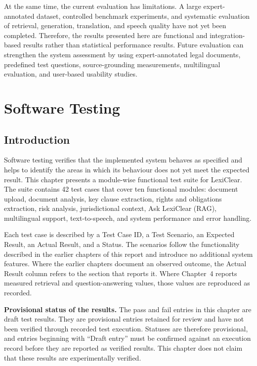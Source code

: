 \documentclass[12pt,a4paper,oneside]{report}
\begin{document}
At the same time, the current evaluation has limitations. A large expert-annotated dataset, controlled benchmark experiments, and systematic evaluation of retrieval, generation, translation, and speech quality have not yet been completed. Therefore, the results presented here are functional and integration-based results rather than statistical performance results. Future evaluation can strengthen the system assessment by using expert-annotated legal documents, predefined test questions, source-grounding measurements, multilingual evaluation, and user-based usability studies.

\chapter{Software Testing}

\section{Introduction}
Software testing verifies that the implemented system behaves as specified and helps to identify the areas in which its behaviour does not yet meet the expected result. This chapter presents a module-wise functional test suite for LexiClear. The suite contains 42 test cases that cover ten functional modules: document upload, document analysis, key clause extraction, rights and obligations extraction, risk analysis, jurisdictional context, Ask LexiClear (RAG), multilingual support, text-to-speech, and system performance and error handling.

Each test case is described by a Test Case ID, a Test Scenario, an Expected Result, an Actual Result, and a Status. The scenarios follow the functionality described in the earlier chapters of this report and introduce no additional system features. Where the earlier chapters document an observed outcome, the Actual Result column refers to the section that reports it. Where Chapter~4 reports measured retrieval and question-answering values, those values are reproduced as recorded.

\textbf{Provisional status of the results.} The pass and fail entries in this chapter are draft test results. They are provisional entries retained for review and have not been verified through recorded test execution. Statuses are therefore provisional, and entries beginning with ``Draft entry'' must be confirmed against an execution record before they are reported as verified results. This chapter does not claim that these results are experimentally verified.
\end{document}
